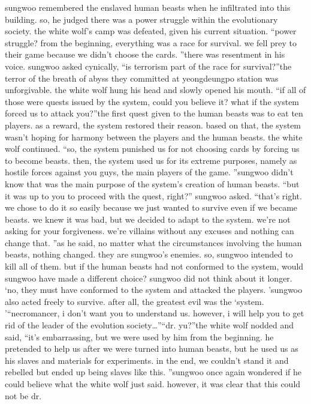 sungwoo remembered the enslaved human beasts when he infiltrated into this building.
 so, he judged there was a power struggle within the evolutionary society.
 the white wolf’s camp was defeated, given his current situation.
“power struggle? from the beginning, everything was a race for survival.
 we fell prey to their game because we didn’t choose the cards.
”there was resentment in his voice.
sungwoo asked cynically, “is terrorism part of the race for survival?”the terror of the breath of abyss they committed at yeongdeungpo station was unforgivable.
 the white wolf hung his head and slowly opened his mouth.
“if all of those were quests issued by the system, could you believe it? what if the system forced us to attack you?”the first quest given to the human beasts was to eat ten players.
 as a reward, the system restored their reason.
 based on that, the system wasn’t hoping for harmony between the players and the human beasts.
the white wolf continued.
“so, the system punished us for not choosing cards by forcing us to become beasts.
 then, the system used us for its extreme purposes, namely as hostile forces against you guys, the main players of the game.
”sungwoo didn’t know that was the main purpose of the system’s creation of human beasts.
“but it was up to you to proceed with the quest, right?” sungwoo asked.
“that’s right.
 we chose to do it so easily because we just wanted to survive even if we became beasts.
 we knew it was bad, but we decided to adapt to the system.
 we’re not asking for your forgiveness.
 we’re villains without any excuses and nothing can change that.
”as he said, no matter what the circumstances involving the human beasts, nothing changed.
 they are sungwoo’s enemies.
 so, sungwoo intended to kill all of them.
but if the human beasts had not conformed to the system, would sungwoo have made a different choice? sungwoo did not think about it longer.
‘no, they must have conformed to the system and attacked the players.
’sungwoo also acted freely to survive.
 after all, the greatest evil was the ‘system.
’“necromancer, i don’t want you to understand us.
 however, i will help you to get rid of the leader of the evolution society…”“dr.
 yu?”the white wolf nodded and said, “it’s embarrassing, but we were used by him from the beginning.
 he pretended to help us after we were turned into human beasts, but he used us as his slaves and materials for experiments.
 in the end, we couldn’t stand it and rebelled but ended up being slaves like this.
”sungwoo once again wondered if he could believe what the white wolf just said.
 however, it was clear that this could not be dr.
